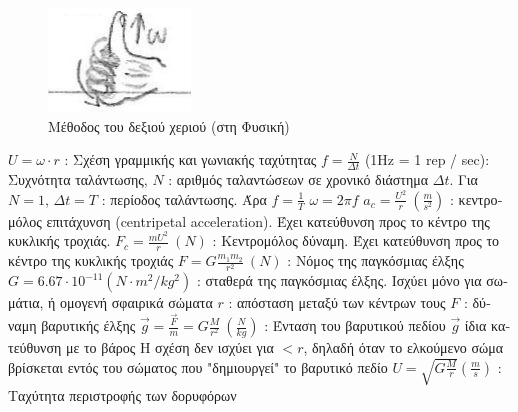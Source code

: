 \documentclass[12pt]{article}
\begin{document}
\begin{flushleft}
	\begin{figure}[H]
	\centering
	\includegraphics[scale=1.6]{rightHand}
	\caption{\textgreek{Μέθοδος του δεξιού χεριού (στη Φυσική)}}
	\label{fig:rightHand}
	\end{figure}
	
	\textbullet \quad $\displaystyle U = \omega \cdot r$  :  \textgreek{Σχέση γραμμικής και γωνιακής ταχύτητας} \linebreak 
	\textbullet \quad $\displaystyle f= \frac{N}{\Delta t} $ (1Hz = 1 rep / sec): \textgreek{Συχνότητα ταλάντωσης,} $N$  :  \textgreek{αριθμός ταλαντώσεων σε χρονικό διάστημα} $\Delta t$. \linebreak 
	\textgreek{Για} $\displaystyle N=1$, $\Delta t = T$  :  \textgreek{περίοδος ταλάντωσης. Άρα} $\displaystyle f=\frac{1}{T}$ \linebreak 
	\textbullet \quad $\displaystyle \omega = 2\pi f$ \linebreak 
	\textbullet \quad $\displaystyle a_c = \frac{U^2}{r} \ (\frac{m}{s^2}) $  :  \textgreek{κεντρομόλος επιτάχυνση} (centripetal acceleration). \textgreek{Έχει κατεύθυνση προς το κέντρο της κυκλικής τροχιάς}. \linebreak 
	\textbullet \quad $\displaystyle F_c = \frac{mU^2}{r} \ (N)$  :  \textgreek{Κεντρομόλος δύναμη. Έχει κατεύθυνση προς το κέντρο της κυκλικής τροχιάς} \linebreak 
	\textbullet \quad $\displaystyle F = G \frac{m_1m_2}{r^2} \ (N) $  :  \textgreek{Νόμος της παγκόσμιας έλξης} \linebreak 
	$G = 6.67 \cdot 10^{-11} (N\cdot m^2 / kg^2 ) $  :  \textgreek{σταθερά της παγκόσμιας έλξης. Ισχύει μόνο για σωμάτια, ή ομογενή σφαιρικά σώματα} $r$  :  \textgreek{απόσταση μεταξύ των κέντρων τους} $F$  :  \textgreek{δύναμη βαρυτικής έλξης} \linebreak 
	\textbullet \quad $\displaystyle \vec{g} = \frac{\vec{F}}{m} = G \frac{M}{r^2} \ (\frac{N}{kg} ) $  :  \textgreek{Ένταση του βαρυτικού πεδίου} $\vec{g}$ \textgreek{ίδια κατεύθυνση με το βάρος} \linebreak 
	\textbullet \quad \textgreek{Η σχέση δεν ισχύει για} $<r$, \textgreek{δηλαδή όταν το ελκούμενο σώμα βρίσκεται εντός του σώματος που "δημιουργεί" το βαρυτικό πεδίο} \linebreak 
	\textbullet \quad $\displaystyle U = \sqrt{G \frac{M}{r}} (\frac{m}{s}) $  :  \textgreek{Ταχύτητα περιστροφής των δορυφόρων} \linebreak 
	

\end{flushleft}
\end{document}
